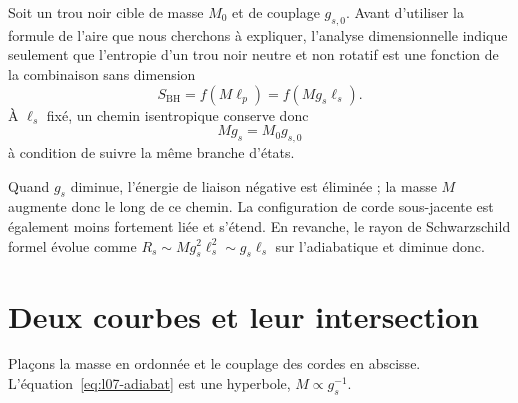 Soit un trou noir cible de masse \(M_0\) et de couplage \(g_{s,0}\). Avant d’utiliser la formule de l’aire que nous cherchons à expliquer, l’analyse dimensionnelle indique seulement que l’entropie d’un trou noir neutre et non rotatif est une fonction de la combinaison sans dimension
\begin{equation}
S_{\mathrm{BH}}=f(M\ell_p)
=f(Mg_s\ell_s).
\label{eq:l07-entropy-function}
\end{equation}
À \(\ell_s\) fixé, un chemin isentropique conserve donc
\begin{equation}
Mg_s=M_0g_{s,0}
\label{eq:l07-adiabat}
\end{equation}
à condition de suivre la même branche d’états.

Quand \(g_s\) diminue, l’énergie de liaison négative est éliminée ; la masse \(M\) augmente donc le long de ce chemin. La configuration de corde sous-jacente est également moins fortement liée et s’étend. En revanche, le rayon de Schwarzschild formel évolue comme \(R_s\sim Mg_s^2\ell_s^2\sim g_s\ell_s\) sur l’adiabatique et diminue donc.

\begin{classroomqa}
\end{classroomqa}

\section{Deux courbes et leur intersection}

Plaçons la masse en ordonnée et le couplage des cordes en abscisse. L’équation~\eqref{eq:l07-adiabat} est une hyperbole, \(M\propto g_s^{-1}\).

\begin{classroomqa}
\end{classroomqa}

